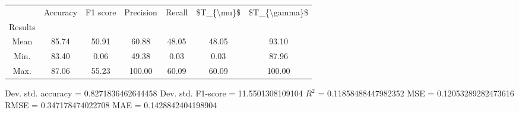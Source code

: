 \begin{tabular}{|c|c|c|c|c|c|c|}
\toprule
{} &  Accuracy &  F1 score &  Precision &  Recall &  \$T\_\{\textbackslash mu\}\$ &  \$T\_\{\textbackslash gamma\}\$ \\
Results &           &           &            &         &            &               \\
\hline
Mean    &     85.74 &     50.91 &      60.88 &   48.05 &      48.05 &         93.10 \\
Min.    &     83.40 &      0.06 &      49.38 &    0.03 &       0.03 &         87.96 \\
Max.    &     87.06 &     55.23 &     100.00 &   60.09 &      60.09 &        100.00 \\
\bottomrule
\end{tabular}

 Dev. std. accuracy = 0.8271836462644458
 Dev. std. F1-score = 11.5501308109104
 $R^2$ = 0.11858488447982352
 MSE = 0.12053289282473616
 RMSE = 0.347178474022708
 MAE = 0.1428842404198904